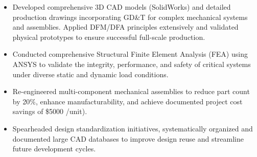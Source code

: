 \documentclass[11pt, letterpaper]{article}
\begin{document}
\begin{itemize}[leftmargin=*, label=\textbullet]
\setlength\itemsep{-2pt}
\vspace{-8pt}
\item Developed comprehensive 3D CAD models (SolidWorks) and detailed production drawings incorporating GD\&T for complex mechanical systems and assemblies. Applied DFM/DFA principles extensively and validated physical prototypes to ensure successful full-scale production.
\item Conducted comprehensive Structural Finite Element Analysis (FEA) using ANSYS to validate the integrity, performance, and safety of critical systems under diverse static and dynamic load conditions. 
\item Re-engineered multi-component mechanical assemblies to reduce part count by 20\%, enhance manufacturability, and achieve documented project cost savings of \$5000 /unit).
\item Spearheaded design standardization initiatives, systematically organized and documented large CAD databases to improve design reuse and streamline future development cycles.
\end{itemize}\vspace{-8pt}
\end{document}
